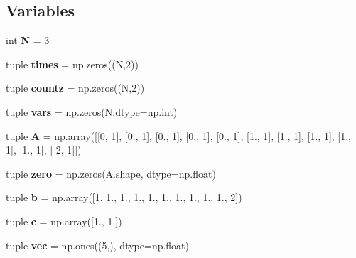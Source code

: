 \subsection*{Variables}
\begin{DoxyCompactItemize}
\item 
\hypertarget{namespaceliftedLP__glpk_a4e6c6645676973b55ec226b68f783297}{int {\bfseries N} = 3}\label{namespaceliftedLP__glpk_a4e6c6645676973b55ec226b68f783297}

\item 
\hypertarget{namespaceliftedLP__glpk_ae3e1a7d33dcbcde918a854241ce7e175}{tuple {\bfseries times} = np.\-zeros((N,2))}\label{namespaceliftedLP__glpk_ae3e1a7d33dcbcde918a854241ce7e175}

\item 
\hypertarget{namespaceliftedLP__glpk_aa2357748fdea638839055c462e45886b}{tuple {\bfseries countz} = np.\-zeros((N,2))}\label{namespaceliftedLP__glpk_aa2357748fdea638839055c462e45886b}

\item 
\hypertarget{namespaceliftedLP__glpk_aeb942d977aa3ad3bc9439dc26ed2c48f}{tuple {\bfseries vars} = np.\-zeros(N,dtype=np.\-int)}\label{namespaceliftedLP__glpk_aeb942d977aa3ad3bc9439dc26ed2c48f}

\item 
\hypertarget{namespaceliftedLP__glpk_a5cd341fa29aec2fc071545f76665a499}{tuple {\bfseries A} = np.\-array(\mbox{[}\mbox{[}0, 1\mbox{]}, \mbox{[}0., 1\mbox{]}, \mbox{[}0., 1\mbox{]}, \mbox{[}0., 1\mbox{]}, \mbox{[}0., 1\mbox{]}, \mbox{[}1., 1\mbox{]}, \mbox{[}1., 1\mbox{]}, \mbox{[}1., 1\mbox{]}, \mbox{[}1., 1\mbox{]}, \mbox{[}1., 1\mbox{]}, \mbox{[} 2, 1\mbox{]}\mbox{]})}\label{namespaceliftedLP__glpk_a5cd341fa29aec2fc071545f76665a499}

\item 
\hypertarget{namespaceliftedLP__glpk_a95a35d9d45ef61962b88b532575f379e}{tuple {\bfseries zero} = np.\-zeros(A.\-shape, dtype=np.\-float)}\label{namespaceliftedLP__glpk_a95a35d9d45ef61962b88b532575f379e}

\item 
\hypertarget{namespaceliftedLP__glpk_af0d2e103e8fd01e3567f266ef73ebfd8}{tuple {\bfseries b} = np.\-array(\mbox{[}1, 1., 1., 1., 1., 1., 1., 1., 1., 1., 2\mbox{]})}\label{namespaceliftedLP__glpk_af0d2e103e8fd01e3567f266ef73ebfd8}

\item 
\hypertarget{namespaceliftedLP__glpk_ac265785acdf39c434c4334bad0ef4e92}{tuple {\bfseries c} = np.\-array(\mbox{[}1., 1.\mbox{]})}\label{namespaceliftedLP__glpk_ac265785acdf39c434c4334bad0ef4e92}

\item 
\hypertarget{namespaceliftedLP__glpk_abf78952e8c3eb229c211e24704420d95}{tuple {\bfseries vec} = np.\-ones((5,), dtype=np.\-float)}\label{namespaceliftedLP__glpk_abf78952e8c3eb229c211e24704420d95}

\end{DoxyCompactItemize}


